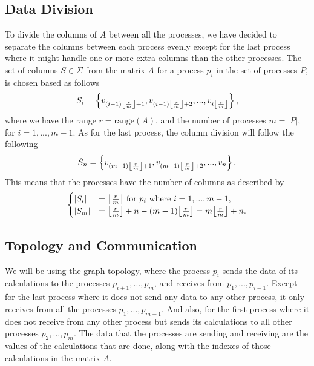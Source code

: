 \documentclass[11pt]{article}
\DeclarePairedDelimiter\floor{\lfloor}{\rfloor}
\theoremstyle{definition}
\begin{document}
\subsection{Data Division}
To divide the columns of $A$ between all the processes, we have decided to separate the columns between each process evenly except for the last process where it might handle one or more extra columns than the other processes. The set of columns $S\in\Sigma$ from the matrix $A$ for a process $p_i$ in the set of processes $P$, is chosen based as follows
\begin{equation*}
S_i=\left\{v_{(i-1)\floor*{\frac{r}{m}}+1},v_{(i-1)\floor*{\frac{r}{m}}+2},...,v_{i\floor*{\frac{r}{m}}}\right\},
\end{equation*}
where we have the range $r=\textrm{range}(A)$, and the number of processes $m=|P|$, for $i=1,...,m-1$. As for the last process, the column division will follow the following
\begin{equation*}
S_n=\left\{v_{(m-1)\floor*{\frac{r}{m}}+1},v_{(m-1)\floor*{\frac{r}{m}}+2},...,v_n\right\}.
\end{equation*}
This means that the processes have the number of columns as described by
\begin{equation*}
\begin{cases}
|S_i|&=\floor*{\frac{r}{m}}\textrm{ for }p_i\textrm{ where }i=1,...,m-1,\\
|S_m|&=\floor*{\frac{r}{m}}+n-(m-1)\floor*{\frac{r}{m}}=m\floor*{\frac{r}{m}}+n.
\end{cases}
\end{equation*}

\subsection{Topology and Communication}
We will be using the graph topology, where the process $p_i$ sends the data of its calculations to the processes $p_{i+1},...,p_m$, and receives from $p_1,...,p_{i-1}$. Except for the last process where it does not send any data to any other process, it only receives from all the processes $p_1,...,p_{m-1}$. And also, for the first process where it does not receive from any other process but sends its calculations to all other processes $p_2,...,p_m$. The data that the processes are sending and receiving are the values of the calculations that are done, along with the indexes of those calculations in the matrix $A$.
\end{document}
